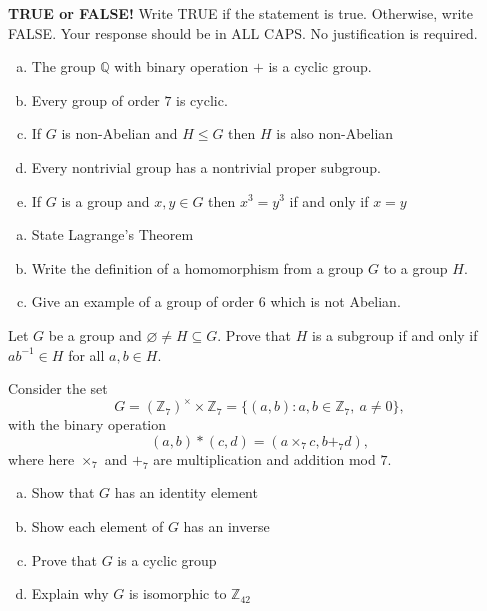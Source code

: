 \documentclass[11pt]{exam}
\theoremstyle{definition}
\begin{document}
\begin{questions}

\addpoints

\question[10]\mbox{}
\textbf{TRUE or FALSE!}  Write  TRUE if the statement is true.  Otherwise, write FALSE.  Your response should be in ALL CAPS.  No justification is required.
\begin{enumerate}[(a)]
\item  The group $\mathbb Q$ with binary operation $+$ is a cyclic group.
\vspace{1.3in}
\item  Every group of order $7$ is cyclic.
\vspace{1.3in}
\item  If $G$ is non-Abelian and $H\leq G$ then $H$ is also non-Abelian
\vspace{1.3in}
\item  Every nontrivial group has a nontrivial proper subgroup.
\vspace{1.3in}
\item  If $G$ is a group and $x,y\in G$ then $x^3 = y^3$ if and only if $x=y$
\vspace{1.3in}
\end{enumerate}

\newpage
\question[10]\mbox{}
\begin{enumerate}[(a)]
\item  State Lagrange's Theorem
\vspace{2in}
\item  Write the definition of a homomorphism from a group $G$ to a group $H$.
\vspace{2in}
\item  Give an example of a group of order $6$ which is not Abelian.
\end{enumerate}

\newpage
\question[10]\mbox{}
Let $G$ be a group and $\varnothing\neq H\subseteq G$.
Prove that $H$ is a subgroup if and only if $ab^{-1}\in H$ for all $a,b\in H$.

\newpage
\question[10]\mbox{}
Consider the set
$$G = (\mathbb{Z}_7)^\times\times \mathbb{Z}_7 = \{(a,b): a,b\in\mathbb{Z}_7,\ a\neq 0\},$$
with the binary operation
$$(a,b) \ast (c,d) = (a\times_7c,b+_7d),$$
where here $\times_7$ and $+_7$ are multiplication and addition mod $7$.

\begin{enumerate}[(a)]
\item Show that $G$ has an identity element
\vspace{1.5in}
\item Show each element of $G$ has an inverse
\vspace{2in}
\item Prove that $G$ is a cyclic group
\vspace{2in}
\item Explain why $G$ is isomorphic to $\mathbb{Z}_{42}$
\end{enumerate}


\end{questions}
\end{document}

